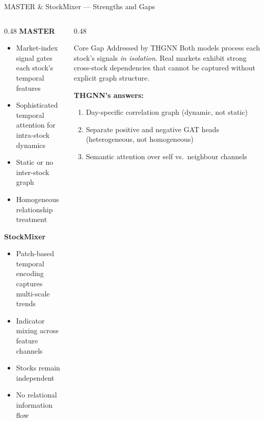 \documentclass[aspectratio=169, 10pt]{beamer}
\begin{document}
\begin{frame}{MASTER \& StockMixer — Strengths and Gaps}
  \begin{columns}[T]
    \begin{column}{0.48\textwidth}
      \textbf{MASTER}
      \begin{itemize}
        \item Market-index signal gates each stock's temporal features
        \item Sophisticated temporal attention for intra-stock dynamics
        \item[\textcolor{negative}{\faTimesCircle}] \textcolor{negative}{Static or no inter-stock graph}
        \item[\textcolor{negative}{\faTimesCircle}] \textcolor{negative}{Homogeneous relationship treatment}
      \end{itemize}
      \bigskip
      \textbf{StockMixer}
      \begin{itemize}
        \item Patch-based temporal encoding captures multi-scale trends
        \item Indicator mixing across feature channels
        \item[\textcolor{negative}{\faTimesCircle}] \textcolor{negative}{Stocks remain independent}
        \item[\textcolor{negative}{\faTimesCircle}] \textcolor{negative}{No relational information flow}
      \end{itemize}
    \end{column}
    \begin{column}{0.48\textwidth}
      \begin{alertblock}{Core Gap Addressed by THGNN}
        Both models process each stock's signals \emph{in isolation}.
        Real markets exhibit strong cross-stock dependencies that cannot
        be captured without explicit graph structure.
      \end{alertblock}
      \bigskip
      \textbf{THGNN's answers:}
      \begin{enumerate}
        \item Day-specific correlation graph (dynamic, not static)
        \item Separate \textcolor{positive}{positive} and \textcolor{negative}{negative}
              GAT heads (heterogeneous, not homogeneous)
        \item Semantic attention over self vs.\ neighbour channels
      \end{enumerate}
    \end{column}
  \end{columns}
\end{frame}
\end{document}
